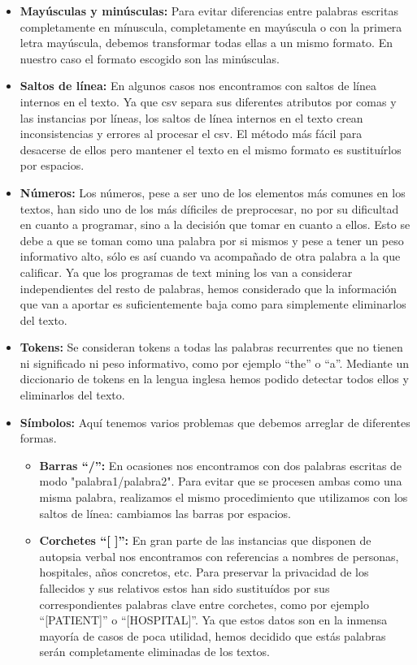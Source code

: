 \documentclass[10pt,a4paper,draft]{article}
\begin{document}
\begin{itemize}
\item \textbf{Mayúsculas y minúsculas:} Para evitar diferencias entre palabras escritas completamente en mínuscula, completamente en mayúscula o con la primera letra mayúscula, debemos transformar todas ellas a un mismo formato. En nuestro caso el formato escogido son las minúsculas.
\item \textbf{Saltos de línea:} En algunos casos nos encontramos con saltos de línea internos en el texto. Ya que csv separa sus diferentes atributos por comas y las instancias por líneas, los saltos de línea internos en el texto crean inconsistencias y errores al procesar el csv. El método más fácil para desacerse de ellos pero mantener el texto en el mismo formato es sustituírlos por espacios.
\item \textbf{Números:} Los números, pese a ser uno de los elementos más comunes en los textos, han sido uno de los más díficiles de preprocesar, no por su dificultad en cuanto a programar, sino a la decisión que tomar en cuanto a ellos. Esto se debe a que se toman como una palabra por si mismos y pese a tener un peso informativo alto, sólo es así cuando va acompañado de otra palabra a la que calificar. Ya que los programas de text mining los van a considerar independientes del resto de palabras, hemos considerado que la información que van a aportar es suficientemente baja como para simplemente eliminarlos del texto.
\item \textbf{Tokens:} Se consideran tokens a todas las palabras recurrentes que no tienen ni significado ni peso informativo, como por ejemplo ``the'' o ``a''. Mediante un diccionario de tokens en la lengua inglesa hemos podido detectar todos ellos y eliminarlos del texto.
\item \textbf{Símbolos:} Aquí tenemos varios problemas que debemos arreglar de diferentes formas.
\begin{itemize} 
\item \textbf{Barras ``/'':} En ocasiones nos encontramos con dos palabras escritas de modo "palabra1/palabra2". Para evitar que se procesen ambas como una misma palabra, realizamos el mismo procedimiento que utilizamos con los saltos de línea: cambiamos las barras por espacios.
\item \textbf{Corchetes ``[ ]'':} En gran parte de las instancias que disponen de autopsia verbal nos encontramos con referencias a nombres de personas, hospitales, años concretos, etc. Para preservar la privacidad de los fallecidos y sus relativos estos han sido sustituídos por sus correspondientes palabras clave entre corchetes, como por ejemplo ``[PATIENT]'' o ``[HOSPITAL]''. Ya que estos datos son en la inmensa mayoría de casos de poca utilidad, hemos decidido que estás palabras serán completamente eliminadas de los textos.
\end{itemize}
\end{itemize}
\end{document}
